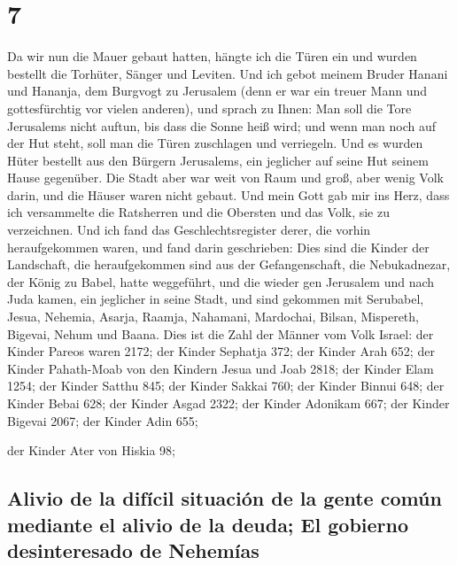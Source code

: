 \hypertarget{section-6}{%
\section{7}\label{section-6}}

 Da wir nun die Mauer gebaut hatten, hängte ich die Türen
ein und wurden bestellt die Torhüter, Sänger und Leviten. 
Und ich gebot meinem Bruder Hanani und Hananja, dem Burgvogt zu
Jerusalem (denn er war ein treuer Mann und gottesfürchtig vor vielen
anderen),  und sprach zu Ihnen: Man soll die Tore
Jerusalems nicht auftun, bis dass die Sonne heiß wird; und wenn man noch
auf der Hut steht, soll man die Türen zuschlagen und verriegeln. Und es
wurden Hüter bestellt aus den Bürgern Jerusalems, ein jeglicher auf
seine Hut seinem Hause gegenüber.  Die Stadt aber war weit
von Raum und groß, aber wenig Volk darin, und die Häuser waren nicht
gebaut.  Und mein Gott gab mir ins Herz, dass ich
versammelte die Ratsherren und die Obersten und das Volk, sie zu
verzeichnen. Und ich fand das Geschlechtsregister derer, die vorhin
heraufgekommen waren, und fand darin geschrieben:  Dies
sind die Kinder der Landschaft, die heraufgekommen sind aus der
Gefangenschaft, die Nebukadnezar, der König zu Babel, hatte weggeführt,
und die wieder gen Jerusalem und nach Juda kamen, ein jeglicher in seine
Stadt,  und sind gekommen mit Serubabel, Jesua, Nehemia,
Asarja, Raamja, Nahamani, Mardochai, Bilsan, Mispereth, Bigevai, Nehum
und Baana. Dies ist die Zahl der Männer vom Volk Israel: 
der Kinder Pareos waren 2172;  der Kinder Sephatja 372;
 der Kinder Arah 652;  der Kinder
Pahath-Moab von den Kindern Jesua und Joab 2818;  der
Kinder Elam 1254;  der Kinder Satthu 845; 
der Kinder Sakkai 760;  der Kinder Binnui 648;
 der Kinder Bebai 628;  der Kinder Asgad
2322;  der Kinder Adonikam 667;  der
Kinder Bigevai 2067;  der Kinder Adin 655;

 der Kinder Ater von Hiskia 98;

\hypertarget{alivio-de-la-difuxedcil-situaciuxf3n-de-la-gente-comuxfan-mediante-el-alivio-de-la-deuda-el-gobierno-desinteresado-de-nehemuxedas}{%
\subsection{Alivio de la difícil situación de la gente común mediante el
alivio de la deuda; El gobierno desinteresado de
Nehemías}\label{alivio-de-la-difuxedcil-situaciuxf3n-de-la-gente-comuxfan-mediante-el-alivio-de-la-deuda-el-gobierno-desinteresado-de-nehemuxedas}}

